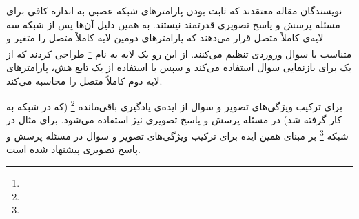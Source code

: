 نویسندگان مقاله 
\cite{noh2016image}
معتقدند که ثابت بودن پارامترهای شبکه عصبی به اندازه کافی برای مسئله پرسش و پاسخ تصویری قدرتمند نیستند. به همین دلیل آن‌ها پس از شبکه 
سه لایه‌ی کاملاً متصل قرار می‌دهند که پارامترهای دومین لایه کاملاً متصل را متغیر و متناسب با سوال وروردی تنظیم می‌کنند. از این رو یک لایه به نام
\footnote{}
طراحی کردند که از یک 
برای بازنمایی سوال استفاده می‌کند و سپس با استفاده از یک تابع هش، پارامتر‌های لایه دوم کاملاً متصل را محاسبه می‌کند.

برای ترکیب ویژگی‌های تصویر و سوال از ایده‌ی یادگیری باقی‌مانده
\footnote{}
(که در شبکه‌
به کار گرفته شد) در مسئله پرسش و پاسخ تصویری نیز استفاده می‌شود. برای مثال در 
\cite{kim2016multimodal}
شبکه 
\footnote{}
بر مبنای همین ایده برای ترکیب ویژگی‌های تصویر و سوال در مسئله پرسش و پاسخ تصویری پیشنهاد شده است.

